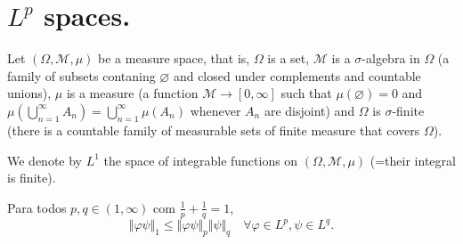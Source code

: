 \documentclass{article}
\theoremstyle{definition}
\numberwithin{equation}{section}
\begin{document}
\section{$L^p$ spaces.}
Let $(\Omega,\mathcal{M},\mu)$ be a measure space, that is, $\Omega$ is a set, $\mathcal{M}$ is a $\sigma$-algebra in $\Omega$ (a family of subsets contaning $\varnothing$ and closed under complements and countable unions), $\mu$ is a measure (a function $\mathcal{M}\to[0,\infty]$ such that $\mu(\varnothing)=0$ and $\mu\left(\bigcup_{n=1}^\infty A_n\right)=\bigcup_{n=1}^\infty\mu(A_n)$ whenever $A_n$ are disjoint) and $\Omega$ is $\sigma$-finite (there is a countable family of measurable sets of finite measure that covers $\Omega$).

We denote by $L^1$ the space of integrable functions on $(\Omega,\mathcal{M},\mu)$ (=their integral is finite).
\begin{thm}
	Para todos $p,q\in(1,\infty)$ com $\frac{1}{p}+\frac{1}{q}=1$,
	\[\Vert\varphi\psi\Vert_1\leq\Vert \varphi\psi\Vert_p\Vert\psi\Vert_q\quad\forall\varphi\in L^p,\psi\in L^q.\]
\end{thm}
\end{document}
